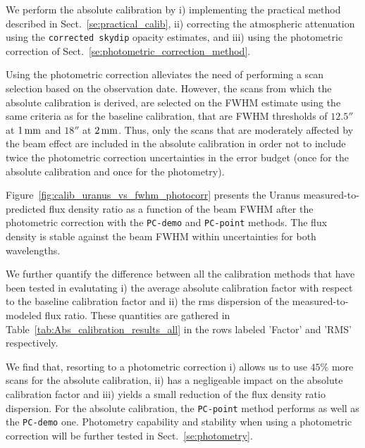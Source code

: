 We perform the absolute calibration by i) implementing the practical
method described in Sect.~\ref{se:practical_calib}, ii) correcting the
atmospheric attenuation using the {\tt corrected skydip} opacity
estimates, and iii) using the photometric correction of
Sect.~\ref{se:photometric_correction_method}.

Using the photometric correction alleviates the need of
performing a scan selection based on the observation date. However,
the scans from which the absolute calibration is derived, are selected
on the FWHM estimate using the same criteria as for the baseline
calibration, that are FWHM thresholds of $12.5''$ at $1\, \rm{mm}$ and $18''$ at
$2\, \rm{mm}$. Thus, only the scans that are moderately affected by the beam
effect are included in the absolute calibration in order not to
include twice the photometric correction uncertainties in the error
budget (once for the absolute calibration and once for the photometry).

Figure~\ref{fig:calib_uranus_vs_fwhm_photocorr} presents the Uranus
measured-to-predicted flux density ratio as a function of the beam FWHM
after the photometric correction with the {\tt PC-demo} and
{\tt PC-point} methods. The flux
density is stable against the beam FWHM within uncertainties for both
wavelengths.


We further quantify the
difference between all the calibration methods that have been tested
in evalutating i) the average absolute calibration factor
with respect to the baseline calibration factor and
ii) the rms dispersion of the measured-to-modeled flux ratio. These
quantities are gathered in Table~\ref{tab:Abs_calibration_results_all}
in the rows labeled 'Factor' and 'RMS' respectively. 

We find that, resorting to a photometric correction i) allows us to use $45\%$ more
scans for the absolute calibration, ii) has a negligeable impact on
the absolute calibration factor and iii) yields a small reduction of
the flux density ratio dispersion. For the absolute calibration, the
{\tt PC-point} method performs as well as the {\tt PC-demo} one.
Photometry capability and stability when using a photometric
correction will be further tested in Sect.~\ref{se:photometry}. 
